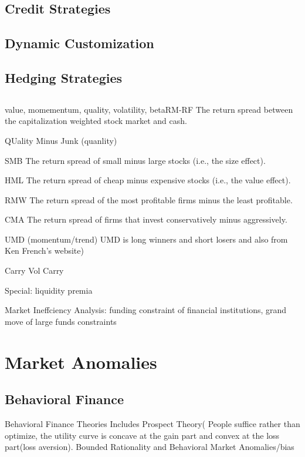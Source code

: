 \documentclass[11pt, openany]{book}              %
\begin{document}
\subsection{Credit Strategies}

\subsection{Dynamic Customization}

\subsection{Hedging Strategies}



\subsection{}

value, momementum, quality, volatility, betaRM-RF  The return spread between the capitalization weighted stock market and cash.

QUality Minus Junk (quanlity)

SMB      The return spread of small minus large stocks (i.e., the size effect).

HML      The return spread of cheap minus expensive stocks (i.e., the value effect).

RMW     The return spread of the most profitable firms minus the least profitable.

CMA      The return spread of firms that invest conservatively minus aggressively.

UMD (momentum/trend) UMD is long winners and short losers and also from Ken French’s website)

Carry  Vol Carry


Special: liquidity premia 


Market Ineffciency Analysis: funding constraint of financial institutions, grand move of large funds constraints

\section{Market Anomalies}

\subsection{Behavioral Finance}

Behavioral Finance Theories Includes Prospect Theory( People suffice rather than optimize, the utility curve is concave at the gain part and convex at the loss part(loss aversion). Bounded Rationality and 
Behavioral Market Anomalies/bias
\end{document}
